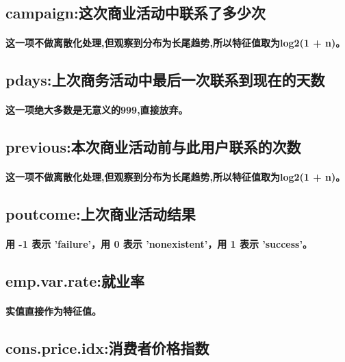 \documentclass{ctexart}
\begin{document}
        \subsection{campaign:这次商业活动中联系了多少次}
        \paragraph{
            这一项不做离散化处理,但观察到分布为长尾趋势,所以特征值取为log2(1 + n)。
        }

        \subsection{pdays:上次商务活动中最后一次联系到现在的天数}
        \paragraph{
            这一项绝大多数是无意义的999,直接放弃。
        }
        
        \subsection{previous:本次商业活动前与此用户联系的次数}
        \paragraph{
            这一项不做离散化处理,但观察到分布为长尾趋势,所以特征值取为log2(1 + n)。
        }

        \subsection{poutcome:上次商业活动结果}
        \paragraph{
            用 -1 表示 'failure'，用 0 表示 'nonexistent'，用 1 表示 'success'。
        }
        \subsection{emp.var.rate:就业率}
        \paragraph{
            实值直接作为特征值。
        }
        \subsection{cons.price.idx:消费者价格指数}
\end{document}
